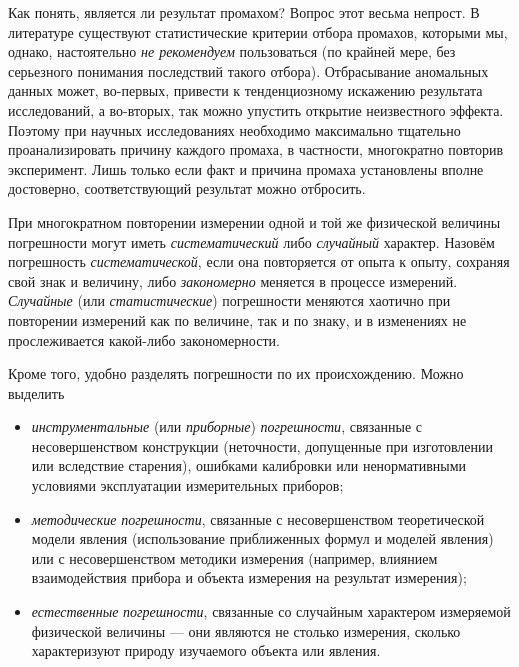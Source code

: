 
Как понять, является ли  результат промахом? Вопрос этот весьма
непрост. В литературе существуют статистические
критерии отбора промахов, которыми мы, однако, настоятельно \emph{не рекомендуем}
пользоваться (по крайней мере, без серьезного понимания последствий
такого отбора). Отбрасывание аномальных данных может, во-первых, привести
к тенденциозному искажению результата исследований, а во-вторых, так
можно упустить открытие неизвестного эффекта. Поэтому при научных
исследованиях необходимо максимально тщательно проанализировать причину
каждого промаха, в частности, многократно повторив эксперимент. Лишь
только если факт и причина промаха установлены вполне достоверно,
соответствующий результат можно отбросить.


При многократном повторении измерении одной и той же физической величины
погрешности могут иметь \emph{систематический} либо \emph{случайный}
характер. Назовём погрешность \emph{систематической}, если она повторяется
от опыта к опыту, сохраняя свой знак и величину, либо \emph{закономерно}
меняется в процессе измерений. \emph{Случайные} (или \emph{статистические})
погрешности меняются хаотично при повторении измерений как по величине,
так и по знаку, и в изменениях не прослеживается какой-либо закономерности.

Кроме того, удобно разделять погрешности по их происхождению. Можно
выделить
\begin{itemize}
    \item \emph{инструментальные} (или \emph{приборные}) \emph{погрешности},
связанные с несовершенством конструкции (неточности, допущенные при
изготовлении или вследствие старения), ошибками калибровки или ненормативными
условиями эксплуатации измерительных приборов;
    \item \emph{методические} \emph{погрешности}, связанные с несовершенством
теоретической модели явления (использование приближенных формул и
моделей явления) или с несовершенством методики измерения (например,
влиянием взаимодействия прибора и объекта измерения на результат измерения);
    \item \emph{естественные} \emph{погрешности}, связанные со случайным
характером
измеряемой физической величины --- они являются не столько
 измерения, сколько характеризуют
природу изучаемого объекта или явления.
\end{itemize}

